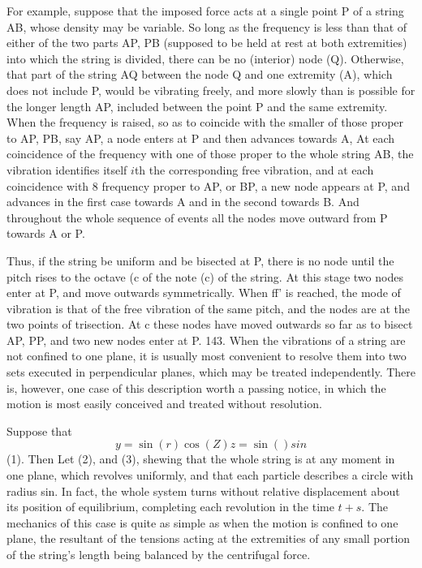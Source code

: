 For example, suppose that the imposed force acts at a single point P of
a string AB, whose density may be variable. So long as the frequency is
less than that of either of the two parts AP, PB (supposed to be held at
rest at both extremities) into which the string is divided, there can be
no (interior) node (Q). Otherwise, that part of the string AQ between
the node Q and one extremity (A), which does not include P, would be
vibrating freely, and more slowly than is possible for the longer
length AP, included between the point P and the same extremity. When the
frequency is raised, so as to coincide with the smaller of those proper
to AP, PB, say AP, a node enters at P and then advances towards A, At
each coincidence of the frequency with one of those proper to the whole
string AB, the vibration identifies itself \(i\)th the corresponding free
vibration, and at each coincidence with 8 frequency proper to AP, or
BP, a new node appears at P, and advances in the first case towards A
and in the second towards B. And throughout the whole sequence of events
all the nodes move outward from P towards A or P.

Thus, if the string be uniform and be bisected at P, there is no node
until the pitch rises to the octave (c of the note (c) of the string. At
this stage two nodes enter at P, and move outwards symmetrically. When
ff' is reached, the mode of vibration is that of the free vibration of
the same pitch, and the nodes are at the two points of trisection. At c
these nodes have moved outwards so far as to bisect AP, PP, and two new
nodes enter at P.
143. When the vibrations of a string are not confined to one plane, it
is usually most convenient to resolve them into two sets executed in
perpendicular planes, which may be treated independently. There is,
however, one case of this description worth a passing notice, in which
the motion is most easily conceived and treated without resolution.

Suppose that
\[y= \sin(r) \cos(Z) z= \sin() sin\]
(1). Then Let (2), and (3), shewing that the whole string is at any
moment in one plane, which revolves uniformly, and that each particle
describes a circle
with radius sin. In fact, the whole system turns without
relative displacement about its position of equilibrium, completing each
revolution in the time \(t+s\). The mechanics of this case is quite as
simple as when the motion is confined to one plane, the resultant of the
tensions acting at the extremities of any small portion of the string's
length being balanced by the centrifugal force.

